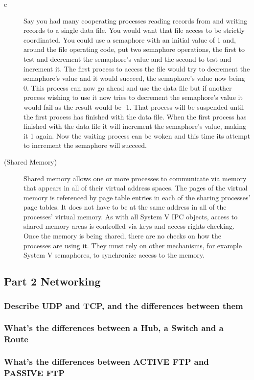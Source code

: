 \documentclass{article}
\begin{document}
\begin{mitned}{c}
\begin{description}
Say you had many cooperating processes reading records from and writing records to a single data file. You would want that file access to be strictly coordinated. You could use a semaphore with an initial value of 1 and, around the file operating code, put two semaphore operations, the first to test and decrement the semaphore's value and the second to test and increment it. The first process to access the file would try to decrement the semaphore's value and it would succeed, the semaphore's value now being 0. This process can now go ahead and use the data file but if another process wishing to use it now tries to decrement the semaphore's value it would fail as the result would be -1. That process will be suspended until the first process has finished with the data file. When the first process has finished with the data file it will increment the semaphore's value, making it 1 again. Now the waiting process can be woken and this time its attempt to increment the semaphore will succeed.
\item[(Shared Memory)] Shared memory allows one or more processes to communicate via memory that appears in all of their virtual address spaces. The pages of the virtual memory is referenced by page table entries in each of the sharing processes' page tables. It does not have to be at the same address in all of the processes' virtual memory. As with all System V IPC objects, access to shared memory areas is controlled via keys and access rights checking. Once the memory is being shared, there are no checks on how the processes are using it. They must rely on other mechanisms, for example System V semaphores, to synchronize access to the memory.
\end{description}

\subsection{Part 2 Networking}
\subsubsection{Describe UDP and TCP, and the differences between them}

\subsubsection{What's the differences between a Hub, a Switch and a Route}

\subsubsection{What's the differences between ACTIVE FTP and PASSIVE FTP}


\end{mitned}
\end{document}
